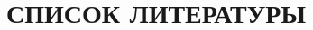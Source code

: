 \section*{СПИСОК ЛИТЕРАТУРЫ}

\vspace{1\baselineskip} 


\begin{thebibliography}{9}
    
    \the\citetoks
    
\end{thebibliography}

%
%
%
%
